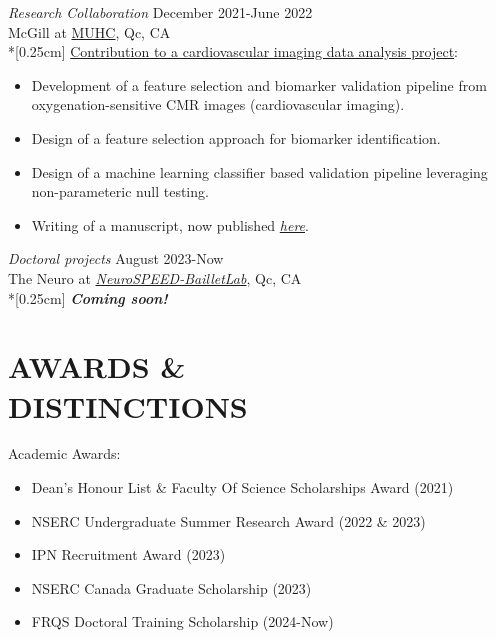 \documentclass[margin, 10pt]{res} %
\begin{document}
\begin{resume}
		{\sl Research Collaboration} \hfill December 2021-June 2022\\McGill at \href{https://muhc.ca/research}{MUHC}, Qc, CA\\*[0.25cm] 
		\href{https://link.springer.com/article/10.1007/s12265-023-10474-7}{Contribution to a cardiovascular imaging data analysis project}:
		\vspace*{0.15cm}
		\begin{itemize} \itemsep -2pt %
			\item[\ding{227}] Development of a feature selection and biomarker validation pipeline from oxygenation-sensitive CMR images (cardiovascular imaging).
			\item Design of a feature selection approach for biomarker identification.
			\item Design of a machine learning classifier based validation pipeline leveraging non-parameteric null testing.
			\item Writing of a manuscript, now published \href{https://link.springer.com/article/10.1007/s12265-023-10474-7}{\textit{here}}.
		\end{itemize}
	
		{\sl Doctoral projects} \hfill August 2023-Now\\The Neuro at \href{https://www.neurospeed-bailletlab.org/}{\textit{NeuroSPEED-BailletLab}}, Qc, CA\\*[0.25cm] 
		\vspace*{0.15cm}
		\textit{\textbf{Coming soon!}}
		
			
		\section{AWARDS \& \\ DISTINCTIONS}
		Academic Awards:
		\vspace*{0.15cm}
		\begin{itemize}\itemsep -2pt %
			\item Dean's Honour List \& Faculty Of Science Scholarships Award (2021)
			\item NSERC Undergraduate Summer Research Award (2022 \& 2023)
			\item IPN Recruitment Award (2023)
			\item NSERC Canada Graduate Scholarship (2023)
			\item FRQS Doctoral Training Scholarship (2024-Now)
		\end{itemize}
	

\end{resume}
\end{document}
